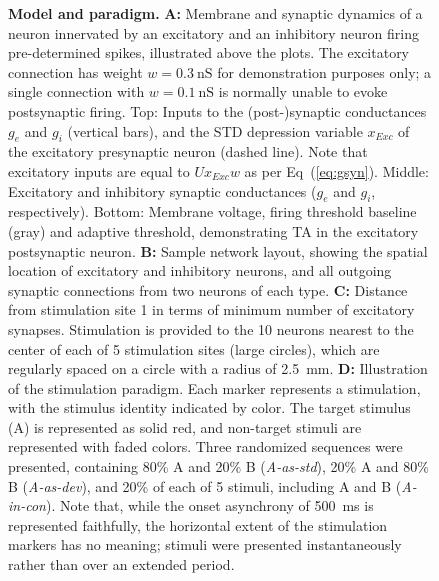\documentclass[10pt,letterpaper]{article}
\newcommand{\dev}{\textit{A-as-dev}}
\newcommand{\msc}{\textit{A-in-con}}
\newcommand{\std}{\textit{A-as-std}}
\newcommand{\EQ}[1]{Eq~(\ref{eq:#1})}
\begin{document}
\begin{figure}[!h]
    \caption{%
        \textbf{Model and paradigm.}
        \textbf{A:} Membrane and synaptic dynamics of a neuron innervated by an excitatory and an inhibitory neuron firing pre-determined spikes, illustrated above the plots. The excitatory connection has weight $w = \qty{0.3}{\nano\siemens}$ for demonstration purposes only; a single connection with $w = \qty{0.1}{\nano\siemens}$ is normally unable to evoke postsynaptic firing. Top: Inputs to the (post-)synaptic conductances $g_e$ and $g_i$ (vertical bars), and the STD depression variable $x_{Exc}$ of the excitatory presynaptic neuron (dashed line). Note that excitatory inputs are equal to $U x_{Exc} w$ as per \EQ{gsyn}. Middle: Excitatory and inhibitory synaptic conductances ($g_e$ and $g_i$, respectively). Bottom: Membrane voltage, firing threshold baseline (gray) and adaptive threshold, demonstrating TA in the excitatory postsynaptic neuron.
        \textbf{B:} Sample network layout, showing the spatial location of excitatory and inhibitory neurons, and all outgoing synaptic connections from two neurons of each type.
        \textbf{C:} Distance from stimulation site 1 in terms of minimum number of excitatory synapses. Stimulation is provided to the 10 neurons nearest to the center of each of 5 stimulation sites (large circles), which are regularly spaced on a circle with a radius of \qty{2.5}{\milli\meter}.
        \textbf{D:} Illustration of the stimulation paradigm. Each marker represents a stimulation, with the stimulus identity indicated by color. The target stimulus (A) is represented as solid red, and non-target stimuli are represented with faded colors. Three randomized sequences were presented, containing 80\% A and 20\% B (\std{}), 20\% A and 80\% B (\dev{}), and 20\% of each of 5 stimuli, including A and B (\msc{}). Note that, while the onset asynchrony of \qty{500}{\milli\second} is represented faithfully, the horizontal extent of the stimulation markers has no meaning; stimuli were presented instantaneously rather than over an extended period.
    }
    \label{fig:1}
\end{figure}
\end{document}
